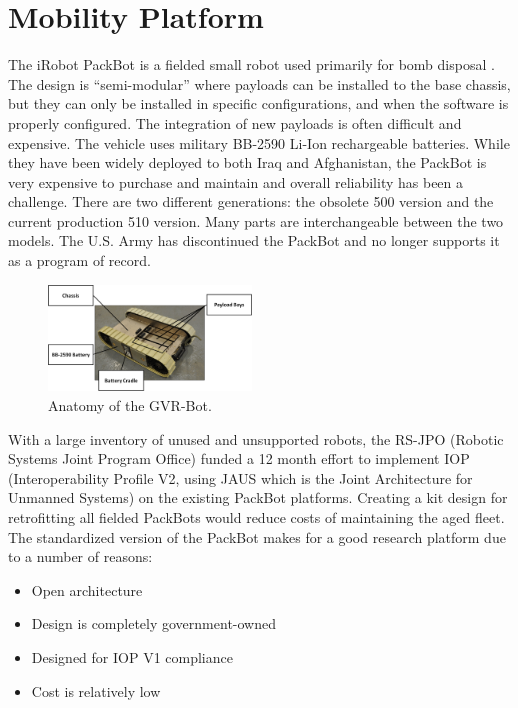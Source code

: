 \section{Mobility Platform}\label{sec:platform}

The iRobot PackBot is a fielded small robot used primarily for bomb disposal \cite{iRobot,Hogg2002}. The design is ``semi-modular'' where payloads can be installed to the base chassis, but they can only be installed in specific configurations, and when the software is properly configured. The integration of new payloads is often difficult and expensive. The vehicle uses military BB-2590 Li-Ion rechargeable batteries. While they have been widely deployed to both Iraq and Afghanistan, the PackBot is very expensive to purchase and maintain and overall reliability has been a challenge. There are two different generations: the obsolete 500 version and the current production 510 version. Many parts are interchangeable between the two models. The U.S. Army has discontinued the PackBot and no longer supports it as a program of record.

\begin{figure}
	\centering
	\includegraphics[width=0.48\textwidth]{./pictures/packbot1.png}
	\caption{Anatomy of the GVR-Bot.}
	\label{fig:packbot}
\end{figure}

With a large inventory of unused and unsupported robots, the RS-JPO (Robotic Systems Joint Program Office) funded a 12 month effort to implement IOP (Interoperability Profile V2, using JAUS which is the Joint Architecture for Unmanned Systems) on the existing PackBot platforms. Creating a kit design for retrofitting all fielded PackBots would reduce costs of maintaining the aged fleet. The standardized version of the PackBot makes for a good research platform due to a number of reasons:
\begin{itemize}
	\item Open architecture
	\item Design is completely government-owned
	\item Designed for IOP V1 compliance
	\item Cost is relatively low
\end{itemize}


